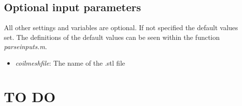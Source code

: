 \documentclass[a4paper,12pt]{book}
\begin{document}
\subsection{Optional input parameters}

All other settings and variables are optional. If not specified the default values set. The definitions of the default values can be seen within the function \textit{parse\textunderscore inputs.m}.


\begin{itemize}
	\item  \textit{coil\textunderscore mesh\textunderscore file}: The name of the .stl file 
\end{itemize}


\section{TO DO}



%
%

\end{document}
